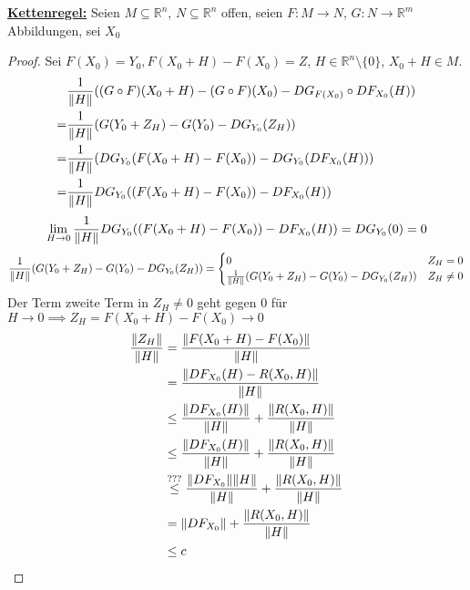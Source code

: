 \documentclass{report}
\newcommand{\tbf}[1]{\textbf{#1}}
\newcommand{\ul}[1]{\underline{#1}}
\newcommand{\bR}{\mathbb{R}}
\begin{document}
\begin{theorem}
\ul{\tbf{Kettenregel:}} Seien $M \subseteq \bR^n$, $N \subseteq \bR^n$ offen, seien $F: M \to N$, $G : N \to \bR^m$ Abbildungen, sei $X_0$
\end{theorem}
\begin{proof}
 Sei $F(X_0) = Y_0, F(X_0 + H) - F(X_0) = Z$, $H \in \bR^n \setminus \{0\}$, $X_0 + H \in M$.
 \begin{align*}
    &\frac{1}{\norm{H}} ((G \circ F)(X_0 + H) - (G \circ F)(X_0) - DG_{F(X_0)} \circ DF_{X_0}(H))\\
    =&\frac{1}{\norm{H}}(G(Y_0 + Z_H) - G(Y_0) - DG_{Y_0}(Z_H))\\
    =&\frac{1}{\norm{H}}(DG_{Y_0}(F(X_0 + H) - F(X_0)) - DG_{Y_0}(DF_{X_0}(H)))\\
    =&\frac{1}{\norm{H}}DG_{Y_0}((F(X_0 + H) - F(X_0)) - DF_{X_0}(H))\\
 \end{align*}
 \begin{align*}
  \lim_{H \to 0}\frac{1}{\norm{H}}DG_{Y_0}((F(X_0 + H) - F(X_0)) - DF_{X_0}(H)) = DG_{Y_0}(0) = 0\\
 \end{align*}
 \begin{align*}
  \frac{1}{\norm{H}}(G(Y_0 + Z_H) - G(Y_0) - DG_{Y_0}(Z_H)) = 
  \begin{cases}
    0 & Z_H = 0\\
    \frac{1}{\norm{H}}(G(Y_0 + Z_H) - G(Y_0) - DG_{Y_0}(Z_H)) & Z_H \neq 0 
  \end{cases}
 \end{align*}
 Der Term zweite Term in $Z_H \neq 0$ geht gegen $0$ für $H \to 0 \implies Z_H = F(X_0 + H) - F(X_0) \to 0$
 \begin{align*}
  \frac{\norm{Z_H}}{\norm{H}} &= \frac{\norm{F(X_0 + H) - F(X_0)}}{\norm{H}} \\
  &= \frac{\norm{DF_{X_0}(H) - R(X_0, H)}}{\norm{H}}\\ 
  &\leq \frac{\norm{DF_{X_0}(H)}}{\norm{H}} + \frac{\norm{R(X_0, H)}}{\norm{H}}\\
  &\leq \frac{\norm{DF_{X_0}(H)}}{\norm{H}} + \frac{\norm{R(X_0, H)}}{\norm{H}}\\
  &\overset{???}{\leq} \frac{\norm{DF_{X_0}}\norm{H}}{\norm{H}} + \frac{\norm{R(X_0, H)}}{\norm{H}}\\
  &= \norm{DF_{X_0}} + \frac{\norm{R(X_0, H)}}{\norm{H}}\\
  &\leq c\\
 \end{align*}
\end{proof}
\end{document}
